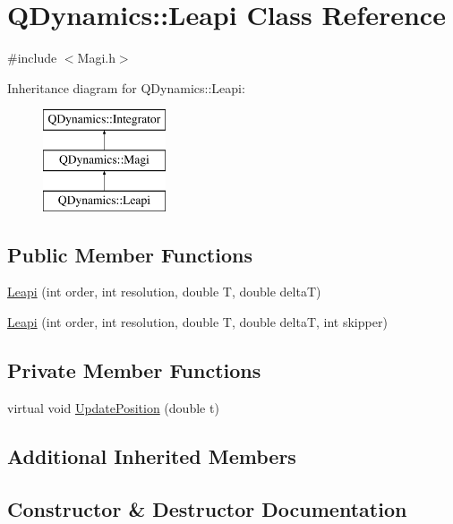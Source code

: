 \hypertarget{classQDynamics_1_1Leapi}{}\section{Q\+Dynamics\+:\+:Leapi Class Reference}
\label{classQDynamics_1_1Leapi}


{\ttfamily \#include $<$Magi.\+h$>$}

Inheritance diagram for Q\+Dynamics\+:\+:Leapi\+:\begin{figure}[H]
\begin{center}
\leavevmode
\includegraphics[height=3.000000cm]{classQDynamics_1_1Leapi}
\end{center}
\end{figure}
\subsection*{Public Member Functions}
\begin{DoxyCompactItemize}
\item 
\hyperlink{classQDynamics_1_1Leapi_aa6feac37d39339e26f89626f7bdbc8f0}{Leapi} (int order, int resolution, double T, double deltaT)
\item 
\hyperlink{classQDynamics_1_1Leapi_a008a9a757055debd2e1da2b5ac64a746}{Leapi} (int order, int resolution, double T, double deltaT, int skipper)
\end{DoxyCompactItemize}
\subsection*{Private Member Functions}
\begin{DoxyCompactItemize}
\item 
virtual void \hyperlink{classQDynamics_1_1Leapi_ada2b4935513fa7e0cb4f78ade9f2fd0e}{Update\+Position} (double t)
\end{DoxyCompactItemize}
\subsection*{Additional Inherited Members}


\subsection{Constructor \& Destructor Documentation}
\mbox{\label{classQDynamics_1_1Leapi_aa6feac37d39339e26f89626f7bdbc8f0}} 
